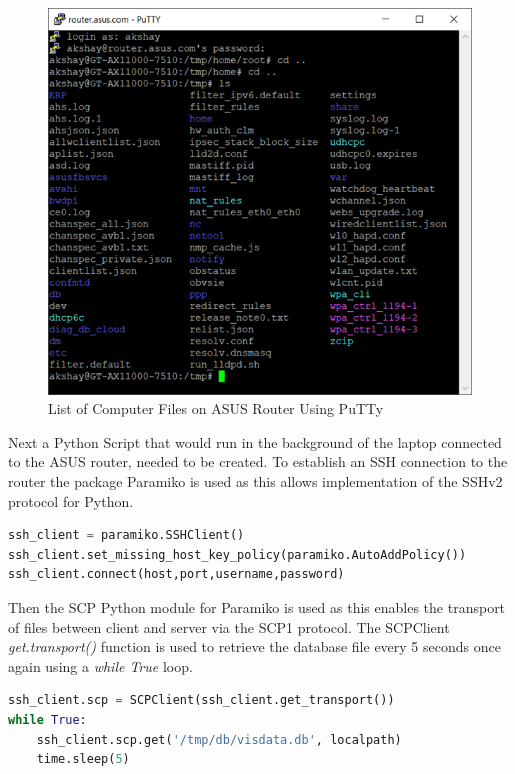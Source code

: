 \begin{figure}[ht]
    \centering
    \includegraphics[width=1\linewidth]{pages/Chapter4/Chapter 4 Images/PuttyFiles.png}
    \caption{List of Computer Files on ASUS Router Using PuTTy}
    \label{fig:PuttyAsusFiles}
\end{figure}

Next a Python Script that would run in the background of the laptop connected to the ASUS router, needed to be created. To establish an SSH connection to the router the package Paramiko \cite{Paramiko} is used as this allows implementation of the SSHv2 protocol for Python.

\begin{lstlisting}[language=Python, caption={Paramiko SSH Client Python Code Snippet}, label={lst:paramiko}]
ssh_client = paramiko.SSHClient()
ssh_client.set_missing_host_key_policy(paramiko.AutoAddPolicy())
ssh_client.connect(host,port,username,password)
\end{lstlisting}

Then the SCP Python module \cite{scp} for Paramiko is used as this enables the transport of files between client and server via the SCP1 protocol. The SCPClient \textit{get.transport()} function is used to retrieve the database file every 5 seconds once again using a \textit{while True} loop.

\begin{lstlisting}[language=Python, caption={SCP Client Python Code Snippet For Data Retrieval}, label={lst:SCP}]
ssh_client.scp = SCPClient(ssh_client.get_transport())
while True:
    ssh_client.scp.get('/tmp/db/visdata.db', localpath)
    time.sleep(5)
\end{lstlisting}



